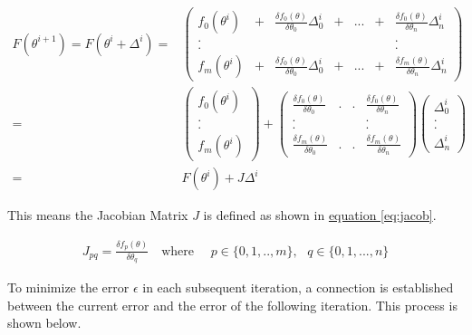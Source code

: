 \begin{align}
	F(\theta^{i+1}) = F(\theta^{i} + \Delta^{i}) =&
		\begin{pmatrix} f_0(\theta^{i}) &+& \frac{\delta f_0(\theta)}{\delta \theta_0} \Delta^{i}_0 &+& ... &+&  \frac{\delta f_0(\theta)}{\delta \theta_n} \Delta^{i}_n  \\
				. && && && . \\
				. && && && . \\
				f_m(\theta^{i}) &+& \frac{\delta f_0(\theta)}{\delta \theta_0} \Delta^{i}_0 &+& ... &+&  \frac{\delta f_m(\theta)}{\delta \theta_n} \Delta^{i}_n 
		\end{pmatrix} \label{eq:taylor1} \\
	=& \begin{pmatrix} f_0(\theta^{i}) \\ . \\ . \\ f_m(\theta^{i})  \end{pmatrix} +
		\begin{pmatrix} \frac{\delta f_0(\theta)}{\delta \theta_0} & . & . & \frac{\delta f_0(\theta)}{\delta \theta_n}  \\
					   . &&& . \\
					   . &&& . \\
					   \frac{\delta f_m(\theta)}{\delta \theta_0} & . & . & \frac{\delta f_m(\theta)}{\delta \theta_n}
		\end{pmatrix} \begin{pmatrix} \Delta^{i}_0 \\ . \\ . \\ \Delta^{i}_n \end{pmatrix}  \label{eq:taylor2} \\
	=& F(\theta^{i}) + J \Delta^{i} \label{eq:taylor3}
\end{align}

	This means the Jacobian Matrix $J$ is defined as shown in \hyperref[eq:jacob]{equation \ref*{eq:jacob}}.

\begin{align}
	J_{pq} = \frac{\delta f_p(\theta)}{\delta \theta_q} \quad \text{where } \quad p \in \{0,1,..,m\},\text{ } q \in \{0,1,...,n\} \label{eq:jacob}
\end{align}

To minimize the error $\epsilon$ in each subsequent iteration, a connection is established between the current error and the
error of the following iteration. This process is shown below.

